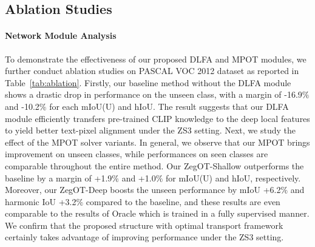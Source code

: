 \documentclass[nohyperref]{article}
\theoremstyle{plain}
\theoremstyle{definition}
\theoremstyle{remark}
\begin{document}
\subsection{Ablation Studies}
\paragraph{Network Module Analysis}
To demonstrate the effectiveness of our proposed DLFA and MPOT modules, we further conduct ablation studies on PASCAL VOC 2012 dataset as reported in Table~\ref{tab:ablation}.  
Firstly, our baseline method without the DLFA module shows a drastic drop in performance on the unseen class, with a margin of -16.9$\%$ and -10.2$\%$ for each mIoU(U) and hIoU. The result suggests that our DLFA module efficiently transfers pre-trained CLIP knowledge to the deep local features to yield better text-pixel alignment under the ZS3 setting.
Next, we study the effect of the MPOT solver variants. In general, we observe that our MPOT brings improvement on unseen classes, while performances on seen classes are comparable throughout the entire method. Our ZegOT-Shallow outperforms the baseline by a margin of +1.9$\%$ and +1.0$\%$ for mIoU(U) and hIoU, respectively. 
Moreover, our ZegOT-Deep boosts the unseen performance by mIoU +6.2$\%$ and harmonic IoU +3.2$\%$ compared to the baseline, and these results are even comparable to the results of Oracle which is trained in a fully supervised manner. %
We confirm that the proposed structure with optimal transport framework certainly takes advantage of improving performance under the ZS3 setting.
\end{document}
